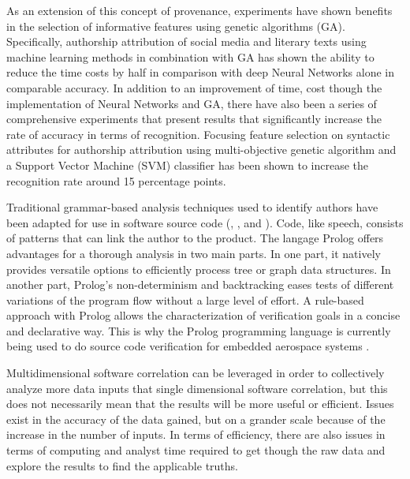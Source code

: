 \documentclass[12pt]{report}
\begin{document}
As an extension of this concept of provenance, experiments have shown benefits in the selection of informative features using genetic algorithms (GA).   Specifically, authorship attribution of social media and literary texts using machine learning methods in combination with GA has shown the ability to reduce the time costs by half in comparison with deep Neural Networks alone in comparable accuracy.  \cite{fedotova2021authorship}  In addition to an improvement of time, cost though the implementation of Neural Networks and GA, there have also been a series of comprehensive experiments that present results that significantly increase the rate of accuracy in terms of recognition.  Focusing feature selection on syntactic attributes for authorship attribution using multi-objective genetic algorithm and a Support Vector Machine (SVM) classifier has been shown to increase the recognition rate around 15 percentage points.  \cite{varela2011selecting}

Traditional grammar-based analysis techniques used to identify authors have been adapted for use in software source code (\cite{kustanto2009automatic}, \cite{lesner2010novel}, and \cite{jadalla2008pde4java}).  Code, like speech, consists of patterns that can link the author to the product.  The langage Prolog offers advantages for a thorough analysis in two main parts.  In one part, it natively provides versatile options to efficiently process tree or graph data structures.   In another part, Prolog’s non-determinism and backtracking eases tests of different variations of the program flow without a large level of effort.  A rule-based approach with Prolog allows the characterization of verification goals in a concise and declarative way.  This is why the Prolog programming language is currently being used to do source code verification for embedded aerospace systems \cite{flederer2017source}.  

Multidimensional software correlation can be leveraged in order to collectively analyze more data inputs that single dimensional software correlation, but this does not necessarily mean that the results will be more useful or efficient.  Issues exist in the accuracy of the data gained, but on a grander scale because of the increase in the number of inputs.  In terms of efficiency, there are also issues in terms of computing and analyst time required to get though the raw data and explore the results to find the applicable truths.  
\end{document}
